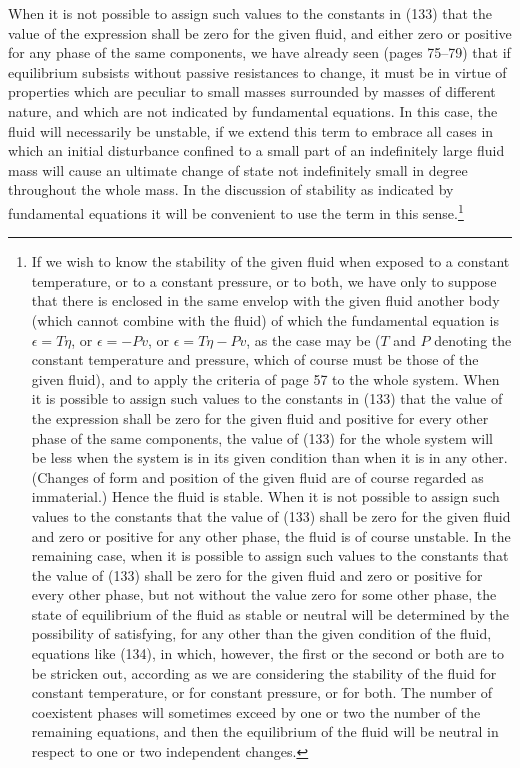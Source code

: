 \documentclass[11pt]{article}
\newcommand{\eps}{\epsilon}
\begin{document}
When it is not possible to assign such values to the constants in (133) that the value of the expression shall be zero for the given fluid, and either zero or positive for any phase of the same components, we have already seen (pages 75--79) that if equilibrium subsists without passive resistances to change, it must be in virtue of properties which are peculiar to small masses surrounded by masses of different nature, and which are not indicated by fundamental equations. In this case, the fluid will necessarily be unstable, if we extend this term to embrace all cases in which an initial disturbance confined to a small part of an indefinitely large fluid mass will cause an ultimate change of state not indefinitely small in degree throughout the whole mass. In the discussion of stability as indicated by fundamental equations it will be convenient to use the term in this sense.\footnote{If we wish to know the stability of the given fluid when exposed to a constant temperature, or to a constant pressure, or to both, we have only to suppose that there is enclosed in the same envelop with the given fluid another body (which cannot combine with the fluid) of which the fundamental equation is \(\eps=T\eta\), or \(\eps=-Pv\), or \(\eps=T\eta-Pv\), as the case may be (\(T\) and \(P\) denoting the constant temperature and pressure, which of course must be those of the given fluid), and to apply the criteria of page 57 to the whole system. When it is possible to assign such values to the constants in (133) that the value of the expression shall be zero for the given fluid and positive for every other phase of the same components, the value of (133) for the whole system will be less when the system is in its given condition than when it is in any other. (Changes of form and position of the given fluid are of course regarded as immaterial.) Hence the fluid is stable. When it is not possible to assign such values to the constants that the value of (133) shall be zero for the given fluid and zero or positive for any other phase, the fluid is of course unstable. In the remaining case, when it is possible to assign such values to the constants that the value of (133) shall be zero for the given fluid and zero or positive for every other phase, but not without the value zero for some other phase, the state of equilibrium of the fluid as stable or neutral will be determined by the possibility of satisfying, for any other than the given condition of the fluid, equations like (134), in which, however, the first or the second or both are to be stricken out, according as we are considering the stability of the fluid for constant temperature, or for constant pressure, or for both. The number of coexistent phases will sometimes exceed by one or two the number of the remaining equations, and then the equilibrium of the fluid will be neutral in respect to one or two independent changes.}
\end{document}
